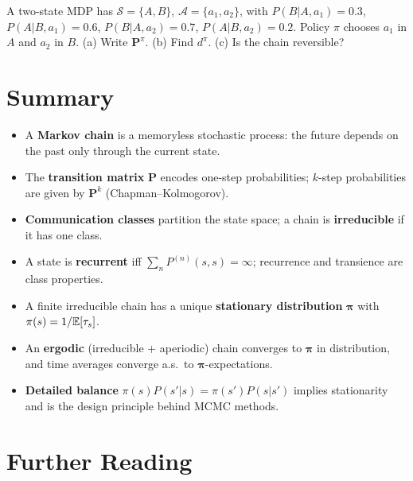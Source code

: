 \documentclass[11pt,a4paper]{article}
\begin{document}
\begin{exercise}[(***)]
\label{ex:mdp_chain}
A two-state MDP has $\mathcal{S} = \{A, B\}$,
$\mathcal{A} = \{a_1, a_2\}$, with $P(B|A,a_1) = 0.3$,
$P(A|B,a_1) = 0.6$, $P(B|A,a_2) = 0.7$, $P(A|B,a_2) = 0.2$.
Policy $\pi$ chooses $a_1$ in $A$ and $a_2$ in $B$.
(a) Write $\mathbf{P}^\pi$.
(b) Find $d^\pi$.
(c) Is the chain reversible?
\end{exercise}


\section{Summary}
\label{sec:summary}

\begin{itemize}[nosep]
  \item A \textbf{Markov chain} is a memoryless stochastic
    process: the future depends on the past only through the
    current state.
  \item The \textbf{transition matrix} $\mathbf{P}$ encodes
    one-step probabilities; $k$-step probabilities are given
    by $\mathbf{P}^k$ (Chapman--Kolmogorov).
  \item \textbf{Communication classes} partition the state
    space; a chain is \textbf{irreducible} if it has one class.
  \item A state is \textbf{recurrent} iff
    $\sum_n P^{(n)}(s,s) = \infty$; recurrence and transience
    are class properties.
  \item A finite irreducible chain has a unique
    \textbf{stationary distribution} $\boldsymbol{\pi}$ with
    $\pi(s) = 1/\mathbb{E}[\tau_s]$.
  \item An \textbf{ergodic} (irreducible + aperiodic) chain
    converges to $\boldsymbol{\pi}$ in distribution, and
    time averages converge a.s.\ to $\boldsymbol{\pi}$-expectations.
  \item \textbf{Detailed balance}
    $\pi(s) P(s'|s) = \pi(s') P(s|s')$ implies stationarity
    and is the design principle behind MCMC methods.
\end{itemize}


\section{Further Reading}
\label{sec:further_reading}
\end{document}
